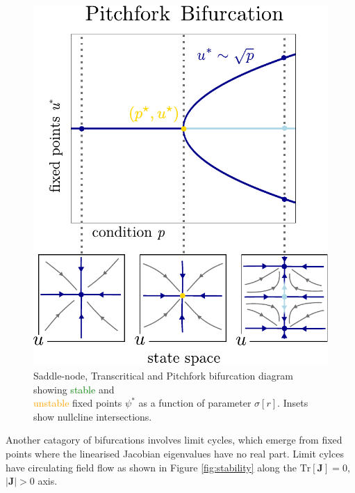 \begin{figure}[H]
\includegraphics[scale=0.35]{figures/pitchfork}
\caption{Saddle-node, Transcritical and Pitchfork bifurcation diagram showing
\textcolor{Green}{stable} and \\\textcolor{orange}{unstable} fixed points $\psi^*$
as a function of parameter $\sigma[r]$. Insets show nullcline intersections.}
\label{fig:bifurcations}
\end{figure}
Another catagory of bifurcations involves limit cycles, which emerge from fixed
points where the linearised Jacobian eigenvalues have no real part. Limit cylces
have circulating field flow as shown in Figure \ref{fig:stability} along the
$\mathrm{Tr}[\mathbf{J}]=0$, $|\mathbf{J}|>0$ axis.

